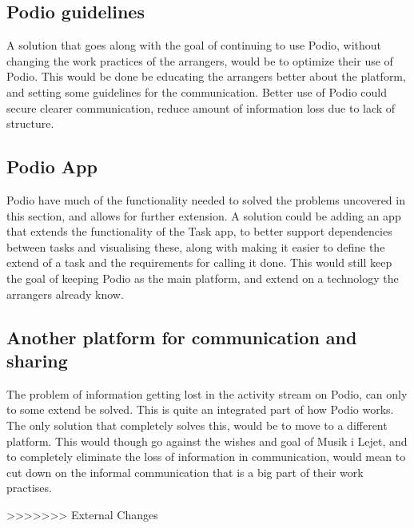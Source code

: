 \subsection{Podio guidelines}
A solution that goes along with the goal of continuing to use Podio, without changing the work practices of the arrangers, would be to optimize their use of Podio. This would be done be educating the arrangers better about the platform, and setting some guidelines for the communication. Better use of Podio could secure clearer communication, reduce amount of information loss due to lack of structure.

\subsection{Podio App}
Podio have much of the functionality needed to solved the problems uncovered in this section, and allows for further extension. A solution could be adding an app that extends the functionality of the Task app, to better support dependencies between tasks and visualising these, along with making it easier to define the extend of a task and the requirements for calling it done. This would still keep the goal of keeping Podio as the main platform, and extend on a technology the arrangers already know.

\subsection{Another platform for communication and sharing}
The problem of information getting lost in the activity stream on Podio, can only to some extend be solved. This is quite an integrated part of how Podio works. The only solution that completely solves this, would be to move to a different platform. This would though go against the wishes and goal of Musik i Lejet, and to completely eliminate the loss of information in communication, would mean to cut down on the informal communication that is a big part of their work practises.

>>>>>>> External Changes
